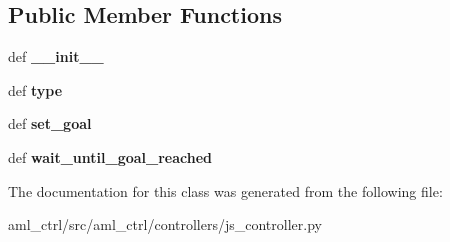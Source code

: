 \subsection*{Public Member Functions}
\begin{DoxyCompactItemize}
\item 
\hypertarget{classaml__ctrl_1_1controllers_1_1js__controller_1_1_j_s_controller_a1be5960e312e049110b8991d51210cfe}{def {\bfseries \-\_\-\-\_\-init\-\_\-\-\_\-}}\label{classaml__ctrl_1_1controllers_1_1js__controller_1_1_j_s_controller_a1be5960e312e049110b8991d51210cfe}

\item 
\hypertarget{classaml__ctrl_1_1controllers_1_1js__controller_1_1_j_s_controller_a79e68c4d8dacce86034685b456d73f35}{def {\bfseries type}}\label{classaml__ctrl_1_1controllers_1_1js__controller_1_1_j_s_controller_a79e68c4d8dacce86034685b456d73f35}

\item 
\hypertarget{classaml__ctrl_1_1controllers_1_1js__controller_1_1_j_s_controller_a6fc08eab26adc2e6b8203000c6354995}{def {\bfseries set\-\_\-goal}}\label{classaml__ctrl_1_1controllers_1_1js__controller_1_1_j_s_controller_a6fc08eab26adc2e6b8203000c6354995}

\item 
\hypertarget{classaml__ctrl_1_1controllers_1_1js__controller_1_1_j_s_controller_abe8dc6b50975e05b50c4f7ab2c2caf7c}{def {\bfseries wait\-\_\-until\-\_\-goal\-\_\-reached}}\label{classaml__ctrl_1_1controllers_1_1js__controller_1_1_j_s_controller_abe8dc6b50975e05b50c4f7ab2c2caf7c}

\end{DoxyCompactItemize}


The documentation for this class was generated from the following file\-:\begin{DoxyCompactItemize}
\item 
aml\-\_\-ctrl/src/aml\-\_\-ctrl/controllers/js\-\_\-controller.\-py\end{DoxyCompactItemize}

